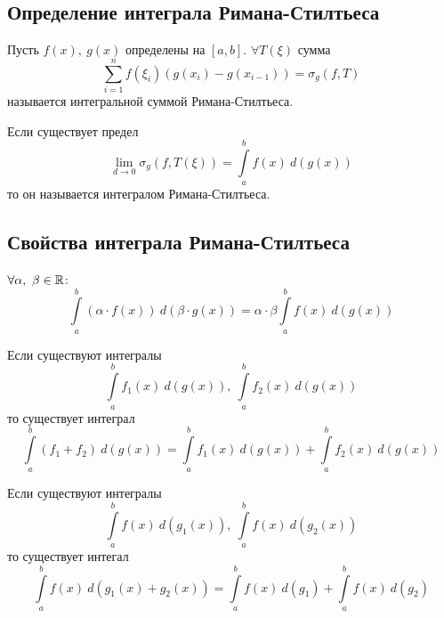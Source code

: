 \subsection{Определение интеграла Римана-Стилтьеса}
\begin{definition}
    Пусть $f(x),\ g(x)$ определены на $[a,b]$. $\forall T(\xi)$ сумма 
    \[\sum\limits_{i=1}^{n} f(\xi_i)(g(x_i)-g(x_{i-1}))=\sigma_g(f,T)\]
    называется интегральной суммой Римана-Стилтьеса.
\end{definition} 
\begin{definition}
    Если существует предел
    \[\lim\limits_{d\to 0}\sigma_g(f, T(\xi))=\int\limits_{a}^{b}f(x)\ d(g(x))\]
    то он называется интегралом Римана-Стилтьеса.
\end{definition}
\subsection{Свойства интеграла Римана-Стилтьеса}
\begin{numtheorem}
    $\forall \alpha,\ \beta\in \mathbb{R}$:
    \[\int\limits_{a}^{b}(\alpha\cdot f(x))\ d(\beta\cdot g(x))=\alpha \cdot \beta \int\limits_{a}^{b} f(x)\ d(g(x))\]
\end{numtheorem} 
\begin{numtheorem}
    Если существуют интегралы
    \[\int\limits_{a}^{b}f_1(x)\ d(g(x)),\ \int\limits_{a}^{b}f_2(x)\ d(g(x))\]
    то существует интеграл 
    \[\int\limits_{a}^{b}(f_1+f_2)\ d(g(x))=\int\limits_{a}^{b}f_1(x)\ d(g(x))+\int\limits_{a}^{b}f_2(x)\ d(g(x))\]
\end{numtheorem} 
\begin{numtheorem}
    Если существуют интегралы
    \[\int\limits_{a}^{b}f(x)\ d(g_1(x)),\ \int\limits_{a}^{b}f(x)\ d(g_2(x))\]
    то существует интегал 
    \[\int\limits_{a}^{b}f(x)\ d(g_1(x)+g_2(x))=\int\limits_{a}^{b}f(x)\ d(g_1)+\int\limits_{a}^{b}f(x)\ d(g_2)\]
\end{numtheorem} 
